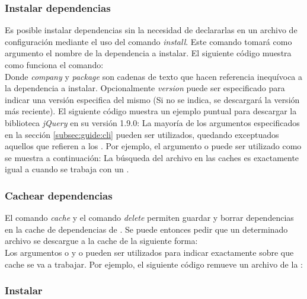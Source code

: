 \subsubsection{Instalar dependencias}
\label{subsubsec:commands:install}

Es posible instalar dependencias sin la necesidad de declararlas en un archivo 
de configuración mediante el uso del comando \emph{install}. Este comando 
tomará como argumento el nombre de la dependencia a instalar. El siguiente 
código muestra como funciona el comando:\\
Donde \emph{company} y \emph{package} son cadenas de texto que hacen referencia 
inequívoca a la dependencia a instalar. Opcionalmente \emph{version} puede ser 
especificado para indicar una versión especifica del mismo (Si no se indica, se 
descargará la versión más reciente). El siguiente código muestra un ejemplo 
puntual para descargar la biblioteca \emph{jQuery} en su versión 1.9.0:
La mayoría de los argumentos especificados en la sección \ref{subsec:guide:cli} 
pueden ser utilizados, quedando exceptuados aquellos que refieren a los 
\conffiles. Por ejemplo, el argumento  o  
puede ser utilizado como se muestra a continuación:
La búsqueda del archivo en las caches es exactamente igual a cuando se trabaja 
con un \conffile. 

\subsubsection{Cachear dependencias}
\label{subsubsec:commands:cache}

El comando \emph{cache} y el comando \emph{delete} permiten guardar y borrar
dependencias en la cache de dependencias de \fronttier. Se puede entonces pedir 
que un determinado archivo se descargue a la cache de la siguiente forma:\\
Los argumentos  o  y  o  
pueden ser utilizados para indicar exactamente sobre que cache se va a 
trabajar. Por ejemplo, el siguiente código remueve un archivo de la \cachel:

\subsubsection{Instalar \plugins}
\label{subsubsec:commands:plugins}

